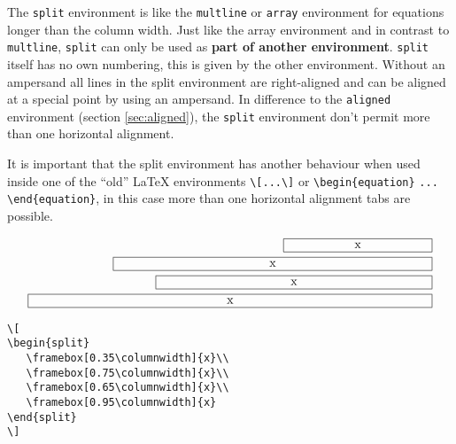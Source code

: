 \begin{table}[htb]
The \verb|split| environment is like the \verb|multline|
or \verb|array| environment for equations longer than the column
width. Just like the array environment and in contrast to \verb|multline|,
\verb|split| can only be used as \textbf{part of another environment}.
\verb|split| itself has no own numbering, this is given by the other
environment. Without an ampersand all lines in the split environment
are right-aligned and can be aligned at a special point by using an
ampersand. In difference to the \verb|aligned| environment (section \vref{sec:aligned}), the \verb|split| 
environment don't permit more than one horizontal alignment.

It is important that the split environment has another behaviour when used inside one of the    %
``old'' \LaTeX{} environments \verb+\[...\]+ or \verb+\begin{equation}+ \verb+...+\verb+ \end{equation}+, in this
case more than one horizontal alignment tabs are possible.

\hspace*{-\marginparwidth}%
\begin{minipage}{0.5\columnwidth}
\[
\begin{split}
   \framebox[0.35\columnwidth]{x}\\
   \framebox[0.75\columnwidth]{x}\\
   \framebox[0.65\columnwidth]{x}\\
   \framebox[0.95\columnwidth]{x}
\end{split}
\]
\end{minipage}\hfill%
\begin{minipage}{0.5\columnwidth}
\footnotesize\begin{verbatim}
\[
\begin{split}
   \framebox[0.35\columnwidth]{x}\\
   \framebox[0.75\columnwidth]{x}\\
   \framebox[0.65\columnwidth]{x}\\
   \framebox[0.95\columnwidth]{x}
\end{split}
\]
\end{verbatim}
\end{minipage}
\vspace{2ex}


\end{table}
